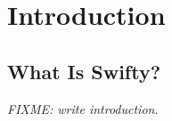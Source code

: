 \chapter{Introduction}
\label{ch:intro}

\section{What Is Swifty?}

\emph{FIXME: write introduction}.
